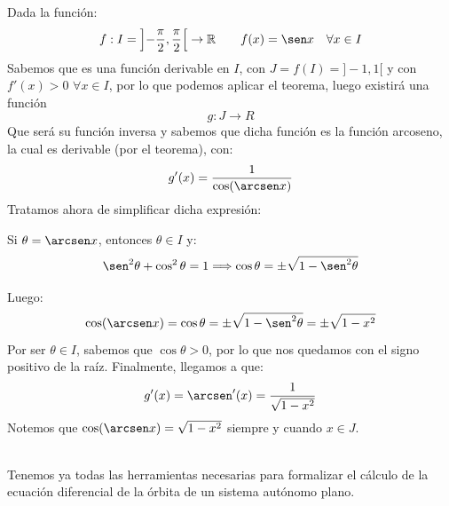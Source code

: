\begin{ejemplo}
    Dada la función:
    \begin{equation*}
        f:I=\left]-\dfrac{\pi}{2},\dfrac{\pi}{2}\right[ \rightarrow \mathbb{R} \qquad f(x) = \sen x \quad \forall x\in I
    \end{equation*}
    Sabemos que es una función derivable en $I$, con $J=f(I)=]-1,1[$ y con $f'(x) > 0$ $\forall x\in I$, por lo que podemos aplicar el teorema, luego existirá una función
    \begin{equation*}
        g:J\rightarrow R
    \end{equation*}
    Que será su función inversa y sabemos que dicha función es la función arcoseno, la cual es derivable (por el teorema), con:
    \begin{equation*}
        g'(x) = \dfrac{1}{\cos(\arcsen x)}
    \end{equation*}
    Tratamos ahora de simplificar dicha expresión:

    Si $\theta = \arcsen x$, entonces $\theta \in I$ y:
    \begin{equation*}
        \sen^2 \theta + \cos^2 \theta = 1 \Longrightarrow \cos \theta = \pm \sqrt{1-\sen^2 \theta}
    \end{equation*}

    Luego:
    \begin{equation*}
        \cos(\arcsen x) = \cos \theta = \pm \sqrt{1-\sen^2 \theta} = \pm \sqrt{1-x^2}
    \end{equation*}
    Por ser $\theta \in I$, sabemos que $\cos \theta > 0$, por lo que nos quedamos con el signo positivo de la raíz. Finalmente, llegamos a que:
    \begin{equation*}
        g'(x) = \arcsen'(x) = \dfrac{1}{\sqrt{1-x^2}}
    \end{equation*}
    Notemos que $\cos(\arcsen x) = \sqrt{1-x^2}$ siempre y cuando $x\in J$.
\end{ejemplo}~\\

Tenemos ya todas las herramientas necesarias para formalizar el cálculo de la ecuación diferencial de la órbita de un sistema autónomo plano.

